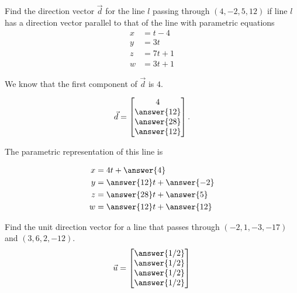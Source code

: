 \documentclass{ximera}
\author{Zack Reed}
\begin{document}
\begin{problem}\label{prob:parameqpointparalline}
  Find the direction vector $\vec{d}$ for the line $l$ passing through $(4, -2, 5, 12)$ if line $l$ has a direction vector parallel to that of the line with parametric equations
  \begin{align*}
  x&=t-4\\
  y&=3t\\
  z&=7t+1\\
  w&=3t+1
  \end{align*}

  We know that the first component of $\vec{d}$ is $4$.

  $$\vec{d}=\begin{bmatrix}
  4\\
  \answer{12}\\
  \answer{28}\\
  \answer{12}
  \end{bmatrix}.$$

  The parametric representation of this line is 

  \begin{align*}
    x&=4t+\answer{4}\\
    y&=\answer{12}t+\answer{-2}\\
    z&=\answer{28}t+\answer{5}\\
    w&=\answer{12}t+\answer{12}
    \end{align*}
  \end{problem}
   
  \begin{problem}\label{prob:directionvect} Find the unit direction vector for a line that passes through $(-2, 1, -3, -17)$ and $(3, 6, 2, -12)$.
    $$\vec{u}=\begin{bmatrix}
      \answer{1/2}\\
      \answer{1/2}\\
      \answer{1/2}\\
      \answer{1/2}\\
    \end{bmatrix}$$
  \end{problem}
   
\end{document}
